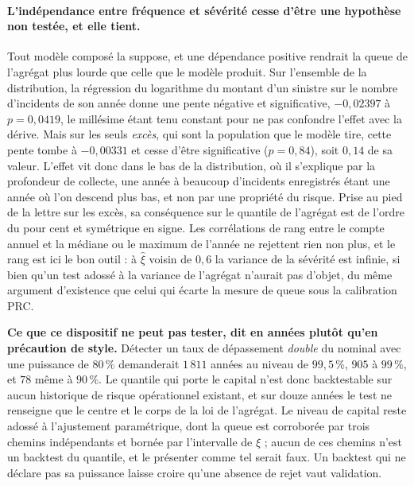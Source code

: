 \paragraph{L'indépendance entre fréquence et sévérité cesse d'être une hypothèse non testée, et
elle tient.} Tout modèle composé la suppose, et une dépendance positive rendrait la queue de
l'agrégat plus lourde que celle que le modèle produit. Sur l'ensemble de la distribution, la
régression du logarithme du montant d'un sinistre sur le nombre d'incidents de son année donne
une pente négative et significative, $-0{,}02397$ à $p = 0{,}0419$, le millésime étant tenu
constant pour ne pas confondre l'effet avec la dérive. Mais sur les seuls \emph{excès}, qui sont
la population que le modèle tire, cette pente tombe à $-0{,}00331$ et cesse d'être significative
($p = 0{,}84$), soit $0{,}14$ de sa valeur. L'effet vit donc dans le bas de la distribution, où il
s'explique par la profondeur de collecte, une année à beaucoup d'incidents enregistrés étant une
année où l'on descend plus bas, et non par une propriété du risque. Prise au pied de la lettre
sur les excès, sa conséquence sur le quantile de l'agrégat est de l'ordre du pour cent et
symétrique en signe. Les corrélations de rang entre le compte annuel et la médiane ou le maximum
de l'année ne rejettent rien non plus, et le rang est ici le bon outil : à $\hat\xi$ voisin de
$0{,}6$ la variance de la sévérité est infinie, si bien qu'un test adossé à la variance de
l'agrégat n'aurait pas d'objet, du même argument d'existence que celui qui écarte la mesure de
queue sous la calibration PRC.

\begin{attention}
\textbf{Ce que ce dispositif ne peut pas tester, dit en années plutôt qu'en précaution de style.}
Détecter un taux de dépassement \emph{double} du nominal avec une puissance de $80\,\%$
demanderait $1\,811$ années au niveau de $99{,}5\,\%$, $905$ à $99\,\%$, et $78$ même à
$90\,\%$. Le quantile qui porte le capital n'est donc backtestable sur aucun historique
de risque opérationnel existant, et sur douze années le test ne renseigne que le centre et le
corps de la loi de l'agrégat. Le niveau de capital reste adossé à l'ajustement paramétrique,
dont la queue est corroborée par trois chemins indépendants et bornée par l'intervalle de
$\xi$ ; aucun de ces chemins n'est un backtest du quantile, et le présenter comme tel serait
faux. Un backtest qui ne déclare pas sa puissance laisse croire qu'une absence de rejet vaut
validation.
\end{attention}

